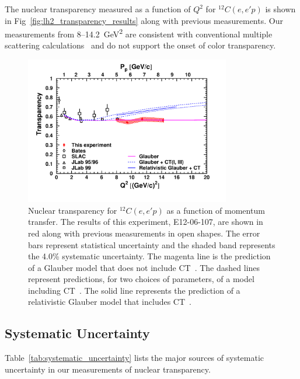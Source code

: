 The nuclear transparency measured as a function of $Q^2$ for ${}^{12}C(e,e'p)$
is shown in Fig~\ref{fig:lh2_transparency_results} along with previous
measurements.
Our measurements from 8--\SI{14.2}{\giga\electronvolt\squared} are consistent
with conventional multiple scattering calculations~\cite{Pandharipande_1992}
and do not support the onset of color transparency.

\begin{figure}[!h]
    \centering
    \includegraphics[width=0.8\textwidth]{chap5/c12_results.pdf}
    \caption{
            Nuclear transparency for ${}^{12}C(e,e'p)$ as a function of
            momentum transfer.
            The results of this experiment, E12-06-107, are shown in red along
            with previous measurements in open shapes.
            The error bars represent statistical uncertainty and the
            shaded band represents the 4.0\% systematic uncertainty.
            The magenta line is the prediction of a Glauber
            model that does not include CT~\cite{Pandharipande_1992}.
            The dashed lines represent predictions, for two choices of
            parameters, of a model including CT~\cite{Frankfurt_1995_PRC}.
            The solid line represents the prediction of a relativistic Glauber
            model that includes CT~\cite{Cosyn_2006}.
            }
    \label{fig:c12_transparency_results}
\end{figure}

\subsection{Systematic Uncertainty}

Table~\ref{tab:systematic_uncertainty} lists the major sources of systematic
uncertainty in our measurements of nuclear transparency.


